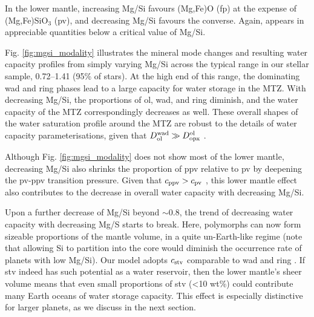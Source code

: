 \documentclass[fleqn,usenatbib]{mnras}
\begin{document}
In the lower mantle, increasing Mg/Si favours (Mg,Fe)O (fp) at the expense of (Mg,Fe)SiO$_3$ (pv), and decreasing Mg/Si favours the converse. Again,  appears in appreciable quantities below a critical value of Mg/Si.

Fig. \ref{fig:mgsi_modality} illustrates the mineral mode changes and resulting water capacity profiles from simply varying Mg/Si across the typical range in our stellar sample, 0.72--1.41 (95\% of stars). At the high end of this range, the dominating wad and ring phases lead to a large capacity for water storage in the MTZ. With decreasing Mg/Si, the proportions of ol, wad, and ring diminish, and the water capacity of the MTZ correspondingly decreases as well. These overall shapes of the water saturation profile around the MTZ are robust to the details of water capacity parameterisations, given that $D^{\rm wad}_{\rm ol} \gg D^{\rm ol}_{\rm opx}$ \citep{bercovici_whole-mantle_2003, dong_constraining_2021, andrault_mantle_2022}. 


Although Fig. \ref{fig:mgsi_modality} does not show most of the lower mantle, decreasing Mg/Si also shrinks the proportion of ppv relative to pv by deepening the pv-ppv transition pressure. Given that $c_{\rm ppv} > c_{\rm pv}$ \citep[in the presence of Al;][]{townsend_water_2016}, this lower mantle effect also contributes to the decrease in overall water capacity with decreasing Mg/Si.

Upon a further decrease of Mg/Si beyond $\sim$0.8, the trend of decreasing water capacity with decreasing Mg/S starts to break. Here,  polymorphs can now form sizeable proportions of the mantle volume, in a quite un-Earth-like regime (note that allowing Si to partition into the core would diminish the occurrence rate of planets with low Mg/Si). Our model adopts $c_{\rm stv}$ comparable to wad and ring \citep{panero_hydrogen_2004, litasov_high_2007}. If stv indeed has such potential as a water reservoir, then the lower mantle's sheer volume means that even small proportions of stv (<10 wt\%) could contribute many Earth oceans of water storage capacity. This effect is especially distinctive for larger planets, as we discuss in the next section.
\end{document}

